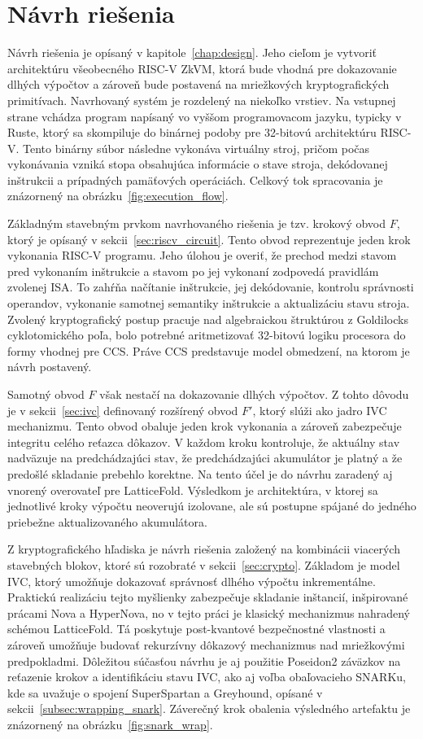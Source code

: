 \section{Návrh riešenia}

Návrh riešenia je opísaný v kapitole~\ref{chap:design}. Jeho cieľom je vytvoriť
architektúru všeobecného RISC-V ZkVM, ktorá bude vhodná pre dokazovanie dlhých
výpočtov a zároveň bude postavená na mriežkových kryptografických primitívach.
Navrhovaný systém je rozdelený na niekoľko vrstiev. Na vstupnej strane vchádza
program napísaný vo vyššom programovacom jazyku, typicky v Ruste, ktorý sa
skompiluje do binárnej podoby pre 32-bitovú architektúru RISC-V. Tento binárny
súbor následne vykonáva virtuálny stroj, pričom počas vykonávania vzniká stopa
obsahujúca informácie o stave stroja, dekódovanej inštrukcii a prípadných
pamäťových operáciách. Celkový tok spracovania je znázornený na
obrázku~\ref{fig:execution_flow}.

Základným stavebným prvkom navrhovaného riešenia je tzv. krokový obvod $F$,
ktorý je opísaný v sekcii~\ref{sec:riscv_circuit}. Tento obvod reprezentuje
jeden krok vykonania RISC-V programu. Jeho úlohou je overiť, že prechod medzi
stavom pred vykonaním inštrukcie a stavom po jej vykonaní zodpovedá pravidlám
zvolenej ISA. To zahŕňa načítanie inštrukcie, jej dekódovanie, kontrolu
správnosti operandov, vykonanie samotnej semantiky inštrukcie a aktualizáciu
stavu stroja. Zvolený kryptografický postup pracuje nad algebraickou
štruktúrou z Goldilocks cyklotomického poľa, bolo potrebné
aritmetizovať 32-bitovú logiku procesora do formy vhodnej pre CCS. Práve CCS
predstavuje model obmedzení, na ktorom je návrh postavený.

Samotný obvod $F$ však nestačí na dokazovanie dlhých výpočtov. Z tohto dôvodu
je v sekcii~\ref{sec:ivc} definovaný rozšírený obvod $F'$, ktorý slúži ako
jadro IVC mechanizmu. Tento obvod obaluje jeden krok vykonania a zároveň
zabezpečuje integritu celého reťazca dôkazov. V každom kroku kontroluje, že
aktuálny stav nadväzuje na predchádzajúci stav, že predchádzajúci akumulátor je
platný a že predošlé skladanie prebehlo korektne. Na tento účel je do návrhu
zaradený aj vnorený overovateľ pre LatticeFold. Výsledkom je architektúra,
v ktorej sa jednotlivé kroky výpočtu neoverujú izolovane, ale sú postupne
spájané do jedného priebežne aktualizovaného akumulátora.

Z kryptografického hľadiska je návrh riešenia založený na kombinácii viacerých
stavebných blokov, ktoré sú rozobraté v sekcii~\ref{sec:crypto}. Základom je
model IVC, ktorý umožňuje dokazovať správnosť dlhého výpočtu inkrementálne.
Praktickú realizáciu tejto myšlienky zabezpečuje skladanie inštancií, inšpirované
prácami Nova a HyperNova, no v tejto práci je klasický mechanizmus nahradený
schémou LatticeFold. Tá poskytuje post-kvantové bezpečnostné vlastnosti a
zároveň umožňuje budovať rekurzívny dôkazový mechanizmus nad mriežkovými
predpokladmi. Dôležitou súčasťou návrhu je aj použitie Poseidon2 záväzkov na
reťazenie krokov a identifikáciu stavu IVC, ako aj voľba obaľovacieho SNARKu, kde sa
uvažuje o spojení SuperSpartan a Greyhound, opísané v
sekcii~\ref{subsec:wrapping_snark}. Záverečný krok obalenia výsledného artefaktu
je znázornený na obrázku~\ref{fig:snark_wrap}.

